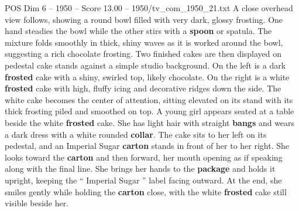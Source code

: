 \begin{textsample}{POS Dim 6 – 1950 – Score 13.00 – 1950/tv\_com\_1950\_21.txt}
A close overhead view follows, showing a round bowl filled with very dark, glossy frosting.
One hand steadies the bowl while the other stirs with a \textbf{spoon} or spatula.
The mixture folds smoothly in thick, shiny waves as it is worked around the bowl, suggesting a rich chocolate frosting.
Two finished cakes are then displayed on pedestal cake stands against a simple studio background.
On the left is a dark \textbf{frosted} cake with a shiny, swirled top, likely chocolate.
On the right is a white \textbf{frosted} cake with high, fluffy icing and decorative ridges down the side.
The white cake becomes the center of attention, sitting elevated on its stand with its thick frosting piled and smoothed on top.
A young girl appears seated at a table beside the white \textbf{frosted} cake.
She has light hair with straight \textbf{bangs} and wears a dark dress with a white rounded \textbf{collar}.
The cake sits to her left on its pedestal, and an Imperial Sugar \textbf{carton} stands in front of her to her right.
She looks toward the \textbf{carton} and then forward, her mouth opening as if speaking along with the final line.
She brings her hands to the \textbf{package} and holds it upright, keeping the “ Imperial Sugar ” label facing outward.
At the end, she smiles gently while holding the \textbf{carton} close, with the white \textbf{frosted} cake still visible beside her.

\end{textsample}
